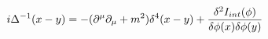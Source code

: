 \begin{equation}
\label{cinque}
i \Delta ^{-1} (x-y)= -{(\partial^{\mu} \partial_{\mu} + m^2)} { \delta ^4(x-y)} +
 {{\delta ^2 I_{int}(\phi)} \over {\delta \phi (x) \delta \phi (y)}}
\end{equation}

